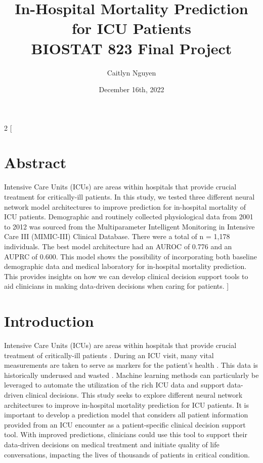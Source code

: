 \documentclass[10pt]{article}
\title{\textbf{In-Hospital Mortality Prediction for ICU Patients} \\ BIOSTAT 823 Final Project }
\author{Caitlyn Nguyen}
\date{December 16th, 2022 }
\begin{document}
\maketitle
\graphicspath{{images/}}

\begin{multicols}{2}
[
\section{Abstract}
Intensive Care Units (ICUs) are areas within hospitals that provide crucial treatment for critically-ill patients. In this study, we tested three different neural network model architectures to improve prediction for in-hospital mortality of ICU patients. Demographic and routinely collected physiological data from 2001 to 2012 was sourced from the Multiparameter Intelligent Monitoring in Intensive Care III (MIMIC-III) Clinical Database. There were a total of  n = 1,178 individuals. The best model architecture had an AUROC of 0.776 and an AUPRC of 0.600. This model shows the possibility of incorporating both baseline demographic data and medical laboratory for in-hospital mortality prediction. This provides insights on how we can develop clinical decision support tools to aid clinicians in making data-driven decisions when caring for patients.
]

\section{Introduction}
Intensive Care Units (ICUs) are areas within hospitals that provide crucial treatment of critically-ill patients \cite{1}. During an ICU visit, many vital measurements are taken to serve as markers for the patient's health \cite{1}. This data is historically underused and wasted \cite{2}. Machine learning methods can particularly be leveraged to automate the utilization of the rich ICU data and support data-driven clinical decisions. This study seeks to explore different neural network architectures to improve in-hospital mortality prediction for ICU patients. It is important to develop a prediction model that considers all patient information provided from an ICU encounter as a patient-specific clinical decision support tool. With improved predictions, clinicians could use this tool to support their data-driven decisions on
medical treatment and initiate quality of life conversations, impacting the lives of thousands of patients in critical condition.


\end{multicols}
\end{document}
